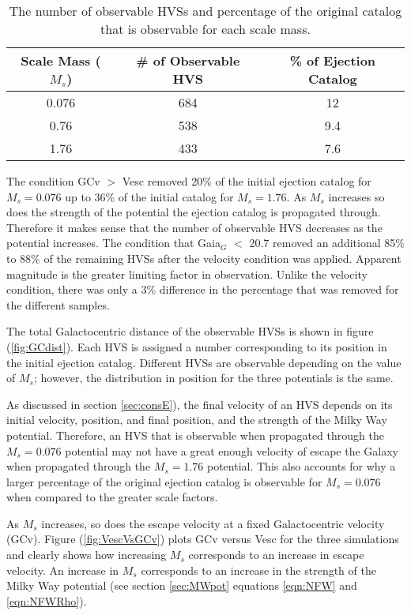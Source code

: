 \documentclass[12pt]{article}
\begin{document}
\begin{table}[H]
    \centering
    \begin{tabular}{|c|c|c|}
    \hline 
        \textbf{Scale Mass ($M_s$)} & \# of Observable HVS & \% of Ejection Catalog \\
        \hline 
        0.076 & 684 & 12 \\
        \hline
        0.76  & 538 & 9.4\\
        \hline
        1.76 & 433 & 7.6 \\
        \hline
    \end{tabular}
    \caption{The number of observable HVSs and percentage of the original catalog that is observable for each scale mass.}
    \label{tab:detectHvs}
\end{table}

The condition GCv $>$ Vesc removed 20\% of the initial ejection catalog for $M_s = 0.076$ up to 36\% of the initial catalog for $M_s = 1.76$. As $M_s$ increases so does the strength of the potential the ejection catalog is propagated through. Therefore it makes sense that the number of observable HVS decreases as the potential increases. The condition that Gaia$_G$ $<$ 20.7 removed an additional 85\% to 88\% of the remaining HVSs after the velocity condition was applied. Apparent magnitude is the greater limiting factor in observation. Unlike the velocity condition, there was only a $3\%$ difference in the percentage that was removed for the different samples.
\par 
The total Galactocentric distance of the observable HVSs is shown in figure (\ref{fig:GCdist}). Each HVS is assigned a number corresponding to its position in the initial ejection catalog. Different HVSs are observable depending on the value of $M_s$; however, the distribution in position for the three potentials is the same. \par 

As discussed in section \ref{sec:consE}), the final velocity of an HVS depends on its initial velocity, position, and final position, and the strength of the Milky Way potential. Therefore, an HVS that is observable when propagated through the $M_s = 0.076$ potential may not have a great enough velocity of escape the Galaxy when propagated through the $M_s = 1.76$ potential. This also accounts for why a larger percentage of the original ejection catalog is observable for $M_s = 0.076$ when compared to the greater scale factors. \par 

As $M_s$ increases, so does the escape velocity at a fixed Galactocentric velocity (GCv). Figure (\ref{fig:VescVsGCv}) plots GCv versus Vesc for the three simulations and clearly shows how increasing $M_s$ corresponds to an increase in escape velocity.
An increase in $M_s$ corresponds to an increase in the strength of the Milky Way potential (see section \ref{sec:MWpot} equations \ref{eqn:NFW} and \ref{eqn:NFWRho}). 
\end{document}
